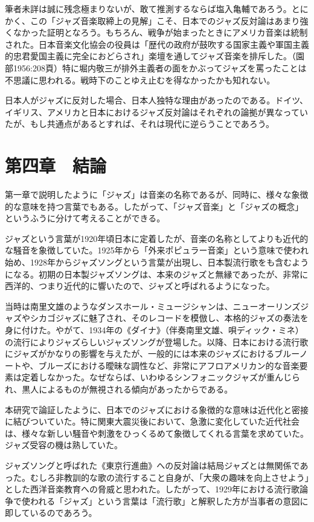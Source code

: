 筆者未詳は誠に残念極まりないが、敢て推測するならば塩入亀輔であろう。とにかく、この「ジャズ音楽取締上の見解」こそ、日本でのジャズ反対論はあまり強くなかった証明となろう。もちろん、戦争が始まったときにアメリカ音楽は統制された。日本音楽文化協会の役員は「歴代の政府が鼓吹する国家主義や軍国主義的忠君愛国主義に完全におどらされ」楽壇を通してジャズ音楽を排斥した。（園部1956:208頁）特に堀内敬三が排外主義者の面をかぶってジャズを罵ったことは不思議に思われる。戦時下のことゆえ止むを得なかったかも知れない。

日本人がジャズに反対した場合、日本人独特な理由があったのである。ドイツ、イギリス、アメリカと日本におけるジャズ反対論はそれぞれの論拠が異なっていたが、もし共通点があるとすれば、それは現代に逆らうことであろう。

\section{第四章　結論}

第一章で説明したように「ジャズ」は音楽の名称であるが、同時に、様々な象徴的な意味を持つ言葉でもある。したがって、「ジャズ音楽」と「ジャズの概念」というふうに分けて考えることができる。

ジャズという言葉が1920年頃日本に定着したが、音楽の名称としてよりも近代的な騒音を象徴していた。1925年から「外来ポピュラー音楽」という意味で使われ始め、1928年からジャズソングという言葉が出現し、日本製流行歌をも含むようになる。初期の日本製ジャズソングは、本来のジャズと無縁であったが、非常に西洋的、つまり近代的に響いたので、ジャズと呼ばれるようになった。

当時は南里文雄のようなダンスホール・ミュージシャンは、ニューオーリンズジャズやシカゴジャズに魅了され、そのレコードを模倣し、本格的ジャズの奏法を身に付けた。やがて、1934年の《ダイナ》（伴奏南里文雄、唄ディック・ミネ）の流行によりジャズらしいジャズソングが登場した。以降、日本における流行歌にジャズがかなりの影響を与えたが、一般的には本来のジャズにおけるブルーノートや、ブルーズにおける曖昧な調性など、非常にアフロアメリカン的な音楽要素は定着しなかった。なぜならば、いわゆるシンフォニックジャズが重んじられ、黒人によるものが無視される傾向があったからである。

本研究で論証したように、日本でのジャズにおける象徴的な意味は近代化と密接に結びついていた。特に関東大震災後において、急激に変化していた近代社会は、様々な新しい騒音や刺激をひっくるめて象徴してくれる言葉を求めていた。ジャズ受容の機は熟していた。

ジャズソングと呼ばれた《東京行進曲》への反対論は結局ジャズとは無関係であった。むしろ非教訓的な歌の流行すること自身が、「大衆の趣味を向上させよう」とした西洋音楽教育への脅威と思われた。したがって、1929年における流行歌論争で使われる「ジャズ」という言葉は「流行歌」と解釈した方が当事者の意図に即しているのであろう。

